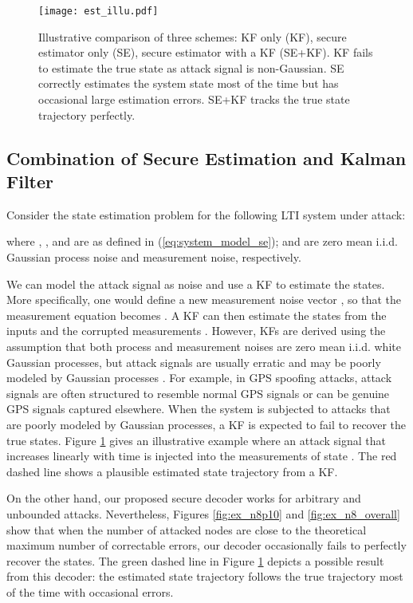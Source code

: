\documentclass[journal]{IEEEtran}
\begin{document}
\begin{figure}
\center
\texttt{[image: est\_illu.pdf]}
\caption{Illustrative comparison of three schemes: KF only (KF), secure estimator only (SE), secure estimator with a KF (SE+KF). KF fails to estimate the true state as attack signal is non-Gaussian. SE correctly estimates the system state most of the time but has occasional large estimation errors. SE+KF tracks the true state trajectory perfectly.}
\label{fig:estimation}
\end{figure}




\subsection{Combination of Secure Estimation and Kalman Filter}\label{sec:estimation}
Consider the state estimation problem for the following LTI system under attack:

where , ,  and  are as defined in (\ref{eq:system_model_se});
 and  are zero mean i.i.d. Gaussian process noise and measurement noise, respectively. 

We can model the attack signal as noise and use a KF to estimate the states. More specifically, one would define a new measurement noise vector , so that the measurement equation becomes . A KF can then estimate the states from the inputs  and the corrupted measurements  \cite{KwonACC}. However, KFs are derived using the assumption that both process and measurement noises are zero mean i.i.d. white Gaussian processes, but attack signals are usually erratic and may be poorly modeled by Gaussian processes \cite{KwonACC}. For example, in GPS spoofing attacks, attack signals are often structured to resemble normal GPS signals or can be genuine GPS signals captured elsewhere. When the system is subjected to attacks that are poorly modeled by Gaussian processes, a KF is expected to fail to recover the true states. Figure \ref{fig:estimation} gives an illustrative example where an attack signal that increases linearly with time is injected into the measurements of state . The red dashed line shows a plausible estimated state trajectory from a KF.

On the other hand, our proposed secure decoder works for arbitrary and unbounded attacks.
Nevertheless, Figures \ref{fig:ex_n8p10} and \ref{fig:ex_n8_overall} show that when the number of attacked nodes are close to the theoretical maximum number of correctable errors, our decoder occasionally fails to perfectly recover the states.
The green dashed line in Figure \ref{fig:estimation} depicts a possible result from this decoder: the estimated state trajectory follows the true trajectory most of the time with occasional errors.
\end{document}
